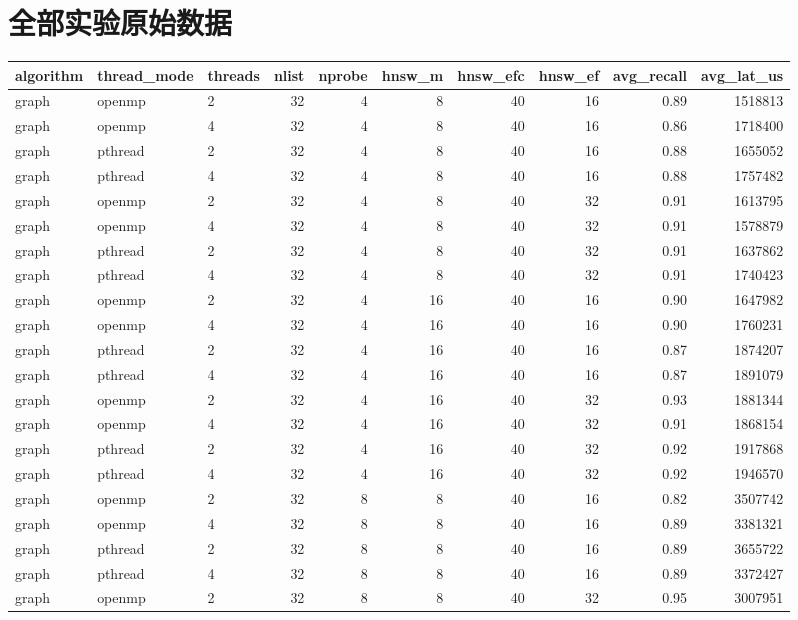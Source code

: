 \documentclass[a4paper]{article}
\begin{document}
\appendix
\section{全部实验原始数据}

{\scriptsize
\begin{longtable}{lllrrrrrrr}
\toprule
algorithm & thread\_mode & threads & nlist & nprobe & hnsw\_m & hnsw\_efc & hnsw\_ef & avg\_recall & avg\_lat\_us \\
\midrule
\endhead
graph & openmp & 2 & 32 & 4 & 8 & 40 & 16 & 0.89 & 1518813 \\
graph & openmp & 4 & 32 & 4 & 8 & 40 & 16 & 0.86 & 1718400 \\
graph & pthread & 2 & 32 & 4 & 8 & 40 & 16 & 0.88 & 1655052 \\
graph & pthread & 4 & 32 & 4 & 8 & 40 & 16 & 0.88 & 1757482 \\
graph & openmp & 2 & 32 & 4 & 8 & 40 & 32 & 0.91 & 1613795 \\
graph & openmp & 4 & 32 & 4 & 8 & 40 & 32 & 0.91 & 1578879 \\
graph & pthread & 2 & 32 & 4 & 8 & 40 & 32 & 0.91 & 1637862 \\
graph & pthread & 4 & 32 & 4 & 8 & 40 & 32 & 0.91 & 1740423 \\
graph & openmp & 2 & 32 & 4 & 16 & 40 & 16 & 0.90 & 1647982 \\
graph & openmp & 4 & 32 & 4 & 16 & 40 & 16 & 0.90 & 1760231 \\
graph & pthread & 2 & 32 & 4 & 16 & 40 & 16 & 0.87 & 1874207 \\
graph & pthread & 4 & 32 & 4 & 16 & 40 & 16 & 0.87 & 1891079 \\
graph & openmp & 2 & 32 & 4 & 16 & 40 & 32 & 0.93 & 1881344 \\
graph & openmp & 4 & 32 & 4 & 16 & 40 & 32 & 0.91 & 1868154 \\
graph & pthread & 2 & 32 & 4 & 16 & 40 & 32 & 0.92 & 1917868 \\
graph & pthread & 4 & 32 & 4 & 16 & 40 & 32 & 0.92 & 1946570 \\
graph & openmp & 2 & 32 & 8 & 8 & 40 & 16 & 0.82 & 3507742 \\
graph & openmp & 4 & 32 & 8 & 8 & 40 & 16 & 0.89 & 3381321 \\
graph & pthread & 2 & 32 & 8 & 8 & 40 & 16 & 0.89 & 3655722 \\
graph & pthread & 4 & 32 & 8 & 8 & 40 & 16 & 0.89 & 3372427 \\
graph & openmp & 2 & 32 & 8 & 8 & 40 & 32 & 0.95 & 3007951 \\

\end{longtable}}
\end{document}
